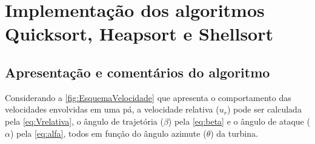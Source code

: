 
\renewcommand{\lstlistingname}{Código}
\lstset{
  basicstyle=\ttfamily,
  breaklines=true,
  frame=single,
  captionpos=b,
  showstringspaces=false,
  keywordstyle=\bfseries,
  numbers=left,
  numberstyle=\tiny
}


\chapter{Implementação dos algoritmos Quicksort,
Heapsort e Shellsort}
\label{chap:fundamentacao-teorica}

\section{Apresentação e comentários do algoritmo}

Considerando a \autoref{fig:EsquemaVelocidade} que apresenta o comportamento das velocidades envolvidas em uma pá, a velocidade relativa ($u_r$) pode ser calculada pela \autoref{eq:Vrelativa}, o ângulo de trajetória ($\beta$) pela \autoref{eq:beta} e o ângulo de ataque ($\alpha$) pela \autoref{eq:alfa}, todos em função do ângulo azimute ($\theta$) da turbina.


